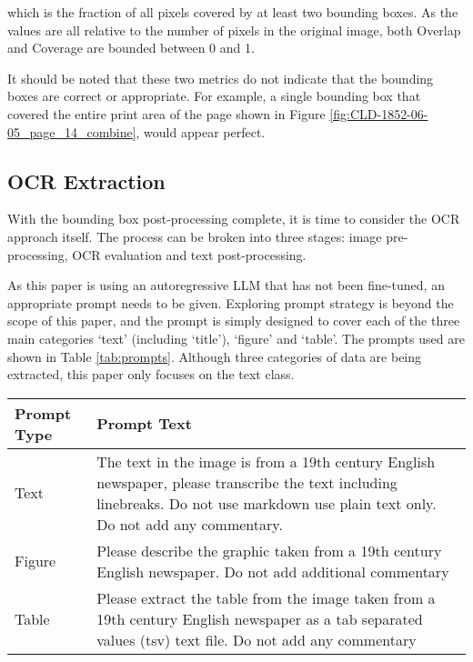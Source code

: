 \documentclass{article} %
\begin{document}
which is the fraction of all pixels covered by at least two bounding boxes. As the values are all relative to the number of pixels in the original image, both Overlap and Coverage are bounded between 0 and 1.

It should be noted that these two metrics do not indicate that the bounding boxes are correct or appropriate. For example, a single bounding box that covered the entire print area of the page shown in Figure \ref{fig:CLD-1852-06-05_page_14_combine}, would appear perfect.

\subsection{OCR Extraction}

With the bounding box post-processing complete, it is time to consider the OCR approach itself. The process can be broken into three stages: image pre-processing, OCR evaluation and text post-processing.

As this paper is using an autoregressive LLM that has not been fine-tuned, an appropriate prompt needs to be given. Exploring prompt strategy is beyond the scope of this paper, and the prompt is simply designed to cover each of the three main categories `text' (including `title'), `figure' and `table'. The prompts used are shown in Table \ref{tab:prompts}. Although three categories of data are being extracted, this paper only focuses on the text class.


\begin{table*}[htbp]
\centering
\begin{tabular}{|p{}|p{}|}
\hline
\textbf{Prompt Type} & \textbf{Prompt Text} \\
\hline
Text & The text in the image is from a 19th century English newspaper, please transcribe the text including linebreaks. Do not use markdown use plain text only. Do not add any commentary. \\
\hline
Figure & Please describe the graphic taken from a 19th century English newspaper. Do not add additional commentary \\
\hline
Table & Please extract the table from the image taken from a 19th century English newspaper as a tab separated values (tsv) text file. Do not add any commentary \\
\hline
\end{tabular}
\caption{Prompts used for converting the data from the different image types into text form.}
\label{tab:prompts}
\end{table*}
\end{document}
